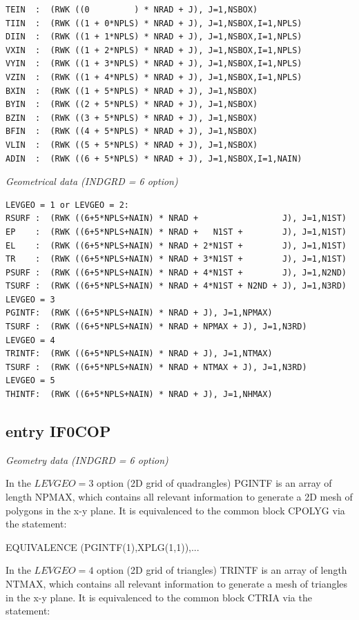 \begin{verbatim}
TEIN  :  (RWK ((0         ) * NRAD + J), J=1,NSBOX)
TIIN  :  (RWK ((1 + 0*NPLS) * NRAD + J), J=1,NSBOX,I=1,NPLS)
DIIN  :  (RWK ((1 + 1*NPLS) * NRAD + J), J=1,NSBOX,I=1,NPLS)
VXIN  :  (RWK ((1 + 2*NPLS) * NRAD + J), J=1,NSBOX,I=1,NPLS)
VYIN  :  (RWK ((1 + 3*NPLS) * NRAD + J), J=1,NSBOX,I=1,NPLS)
VZIN  :  (RWK ((1 + 4*NPLS) * NRAD + J), J=1,NSBOX,I=1,NPLS)
BXIN  :  (RWK ((1 + 5*NPLS) * NRAD + J), J=1,NSBOX)
BYIN  :  (RWK ((2 + 5*NPLS) * NRAD + J), J=1,NSBOX)
BZIN  :  (RWK ((3 + 5*NPLS) * NRAD + J), J=1,NSBOX)
BFIN  :  (RWK ((4 + 5*NPLS) * NRAD + J), J=1,NSBOX)
VLIN  :  (RWK ((5 + 5*NPLS) * NRAD + J), J=1,NSBOX)
ADIN  :  (RWK ((6 + 5*NPLS) * NRAD + J), J=1,NSBOX,I=1,NAIN)
\end{verbatim}
{\sl Geometrical data (INDGRD = 6 option) }
\begin{verbatim}
LEVGEO = 1 or LEVGEO = 2:
RSURF :  (RWK ((6+5*NPLS+NAIN) * NRAD +                 J), J=1,N1ST)
EP    :  (RWK ((6+5*NPLS+NAIN) * NRAD +   N1ST +        J), J=1,N1ST)
EL    :  (RWK ((6+5*NPLS+NAIN) * NRAD + 2*N1ST +        J), J=1,N1ST)
TR    :  (RWK ((6+5*NPLS+NAIN) * NRAD + 3*N1ST +        J), J=1,N1ST)
PSURF :  (RWK ((6+5*NPLS+NAIN) * NRAD + 4*N1ST +        J), J=1,N2ND)
TSURF :  (RWK ((6+5*NPLS+NAIN) * NRAD + 4*N1ST + N2ND + J), J=1,N3RD)
LEVGEO = 3
PGINTF:  (RWK ((6+5*NPLS+NAIN) * NRAD + J), J=1,NPMAX)
TSURF :  (RWK ((6+5*NPLS+NAIN) * NRAD + NPMAX + J), J=1,N3RD)
LEVGEO = 4
TRINTF:  (RWK ((6+5*NPLS+NAIN) * NRAD + J), J=1,NTMAX)
TSURF :  (RWK ((6+5*NPLS+NAIN) * NRAD + NTMAX + J), J=1,N3RD)
LEVGEO = 5
THINTF:  (RWK ((6+5*NPLS+NAIN) * NRAD + J), J=1,NHMAX)
\end{verbatim}

\subsection{entry IF0COP} \label{sec4.1.0}
{\sl Geometry data (INDGRD = 6 option)}

\medskip

In the $LEVGEO=3$ option (2D grid of quadrangles) PGINTF is an array of length NPMAX,
which contains all relevant
information to generate a 2D mesh of polygons in the x-y plane.
It is equivalenced to the common block CPOLYG
via the statement:

EQUIVALENCE (PGINTF(1),XPLG(1,1)),...

In the $LEVGEO=4$ option (2D grid of triangles) TRINTF is an array of length NTMAX,
which contains all relevant
information to generate a mesh of triangles in the x-y plane.
It is equivalenced to the common block CTRIA
via the statement:

